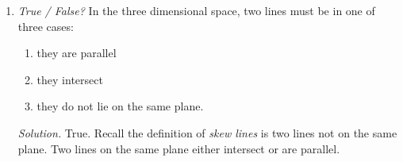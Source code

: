 \documentclass{article}
\begin{document}
\begin{enumerate}
\item {\em True / False?} In the three dimensional space, two lines must be in one of three cases:
\begin{enumerate}
\item they are parallel
\item they intersect
\item they do not lie on the same plane.
\end{enumerate}

{\em Solution.} True. Recall the definition of {\em skew lines} is two lines not on the same plane. Two lines on the same plane either intersect or are parallel.

\end{enumerate}
\end{document}
